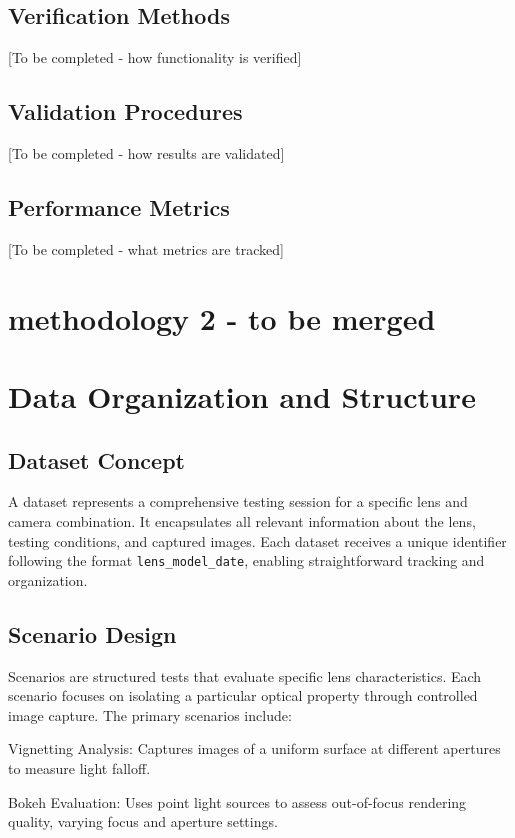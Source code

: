 \subsection{Verification Methods}
[To be completed - how functionality is verified]

\subsection{Validation Procedures}
[To be completed - how results are validated]

\subsection{Performance Metrics}
[To be completed - what metrics are tracked]


\section{methodology 2 - to be merged}
\section{Data Organization and Structure}

\subsection{Dataset Concept}
A dataset represents a comprehensive testing session for a specific lens and camera combination. It encapsulates all relevant information about the lens, testing conditions, and captured images. Each dataset receives a unique identifier following the format \texttt{lens\_model\_date}, enabling straightforward tracking and organization.

\subsection{Scenario Design}
Scenarios are structured tests that evaluate specific lens characteristics. Each scenario focuses on isolating a particular optical property through controlled image capture. The primary scenarios include:

Vignetting Analysis: Captures images of a uniform surface at different apertures to measure light falloff.

Bokeh Evaluation: Uses point light sources to assess out-of-focus rendering quality, varying focus and aperture settings.

